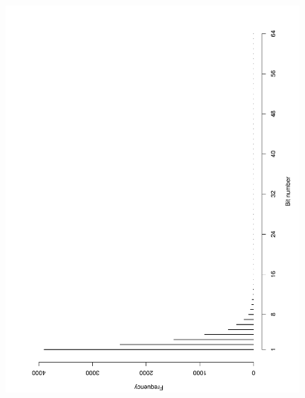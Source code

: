 \documentclass[10pt]{article}
\begin{document}
\begin{figure}[ht]
{  \includegraphics[scale=0.25,angle=-90,clip]{fig03}
  }
\end{figure}
\end{document}
